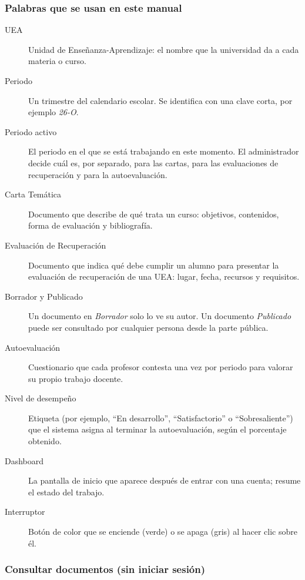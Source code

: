 \subsubsection{Palabras que se usan en este manual}\label{apx:manual-user:glosario}

\begin{description}
    \item[UEA] Unidad de Enseñanza-Aprendizaje: el nombre que la universidad da a cada materia o curso.
    \item[Periodo] Un trimestre del calendario escolar. Se identifica con una clave corta, por ejemplo \emph{26-O}.
    \item[Periodo activo] El periodo en el que se está trabajando en este momento. El administrador decide cuál es, por separado, para las cartas, para las evaluaciones de recuperación y para la autoevaluación.
    \item[Carta Temática] Documento que describe de qué trata un curso: objetivos, contenidos, forma de evaluación y bibliografía.
    \item[Evaluación de Recuperación] Documento que indica qué debe cumplir un alumno para presentar la evaluación de recuperación de una UEA: lugar, fecha, recursos y requisitos.
    \item[Borrador y Publicado] Un documento en \emph{Borrador} solo lo ve su autor. Un documento \emph{Publicado} puede ser consultado por cualquier persona desde la parte pública.
    \item[Autoevaluación] Cuestionario que cada profesor contesta una vez por periodo para valorar su propio trabajo docente.
    \item[Nivel de desempeño] Etiqueta (por ejemplo, ``En desarrollo'', ``Satisfactorio'' o ``Sobresaliente'') que el sistema asigna al terminar la autoevaluación, según el porcentaje obtenido.
    \item[Dashboard] La pantalla de inicio que aparece después de entrar con una cuenta; resume el estado del trabajo.
    \item[Interruptor] Botón de color que se enciende (verde) o se apaga (gris) al hacer clic sobre él.
\end{description}

\subsubsection{Consultar documentos (sin iniciar sesión)}\label{apx:manual-user:publico}

